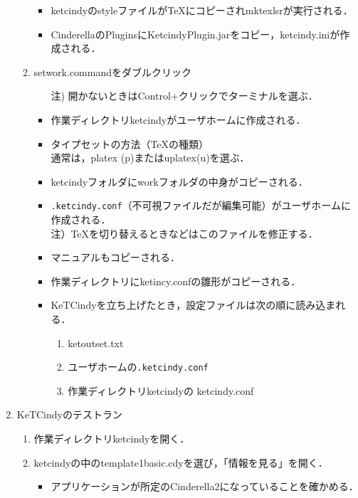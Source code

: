 \documentclass{ujarticle}
\begin{document}
\begin{enumerate}[\bf\large 1.]
\begin{enumerate}[(1)]
\begin{itemize}
    \item ketcindyのstyleファイルがTeXにコピーされmktexlsrが実行される．
    \item CinderellaのPluginsにKetcindyPlugin.jarをコピー，ketcindy.iniが作成される．
    \end{itemize}
  \item setwork.commandをダブルクリック
    \begin{itemize}
    \item[注)]開かないときはControl+クリックでターミナルを選ぶ．
    \end{itemize}
    \begin{itemize}
    \item 作業ディレクトリketcindyがユーザホームに作成される．
    \item タイプセットの方法（TeXの種類）\\
    \hspace*{10mm}通常は，platex (p)またはuplatex(u)を選ぶ．
    \item ketcindyフォルダにworkフォルダの中身がコピーされる．
    \item \verb|.ketcindy.conf|（不可視ファイルだが編集可能）がユーザホームに作成される．\\
    \hspace*{10mm}注）TeXを切り替えるときなどはこのファイルを修正する．
    \item マニュアルもコピーされる．
    \item 作業ディレクトリにketincy.confの雛形がコピーされる．
    \item KeTCindyを立ち上げたとき，設定ファイルは次の順に読み込まれる．
      \begin{enumerate}[1)]
      \item ketoutset.txt
      \item ユーザホームの\verb|.ketcindy.conf|
      \item 作業ディレクトリketcindyの ketcindy.conf
      \end{enumerate}
    \end{itemize}
  \end{enumerate}
  \item KeTCindyのテストラン
    \begin{enumerate}[(1)]
    \item 作業ディレクトリketcindyを開く．
    \item ketcindyの中のtemplate1basic.cdyを選び，「情報を見る」を開く．
      \begin{itemize}
      \item アプリケーションが所定のCinderella2になっていることを確かめる．

\end{itemize}
\end{enumerate}
\end{enumerate}
\end{document}
